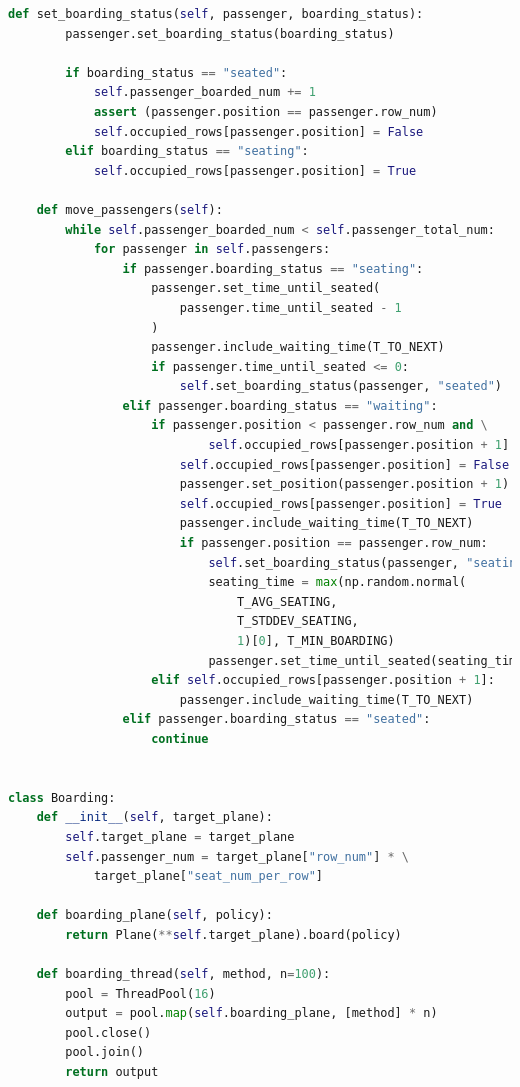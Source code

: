 \documentclass[12pt]{article}
\begin{document}
\begin{lstlisting}[language=python]
    def set_boarding_status(self, passenger, boarding_status):
        passenger.set_boarding_status(boarding_status)

        if boarding_status == "seated":
            self.passenger_boarded_num += 1
            assert (passenger.position == passenger.row_num)
            self.occupied_rows[passenger.position] = False
        elif boarding_status == "seating":
            self.occupied_rows[passenger.position] = True

    def move_passengers(self):
        while self.passenger_boarded_num < self.passenger_total_num:
            for passenger in self.passengers:
                if passenger.boarding_status == "seating":
                    passenger.set_time_until_seated(
                        passenger.time_until_seated - 1
                    )
                    passenger.include_waiting_time(T_TO_NEXT)
                    if passenger.time_until_seated <= 0:
                        self.set_boarding_status(passenger, "seated")
                elif passenger.boarding_status == "waiting":
                    if passenger.position < passenger.row_num and \
                            self.occupied_rows[passenger.position + 1] is False:
                        self.occupied_rows[passenger.position] = False
                        passenger.set_position(passenger.position + 1)
                        self.occupied_rows[passenger.position] = True
                        passenger.include_waiting_time(T_TO_NEXT)
                        if passenger.position == passenger.row_num:
                            self.set_boarding_status(passenger, "seating")
                            seating_time = max(np.random.normal(
                                T_AVG_SEATING,
                                T_STDDEV_SEATING,
                                1)[0], T_MIN_BOARDING)
                            passenger.set_time_until_seated(seating_time)
                    elif self.occupied_rows[passenger.position + 1]:
                        passenger.include_waiting_time(T_TO_NEXT)
                elif passenger.boarding_status == "seated":
                    continue


class Boarding:
    def __init__(self, target_plane):
        self.target_plane = target_plane
        self.passenger_num = target_plane["row_num"] * \
            target_plane["seat_num_per_row"]

    def boarding_plane(self, policy):
        return Plane(**self.target_plane).board(policy)

    def boarding_thread(self, method, n=100):
        pool = ThreadPool(16)
        output = pool.map(self.boarding_plane, [method] * n)
        pool.close()
        pool.join()
        return output


\end{lstlisting}
\end{document}
